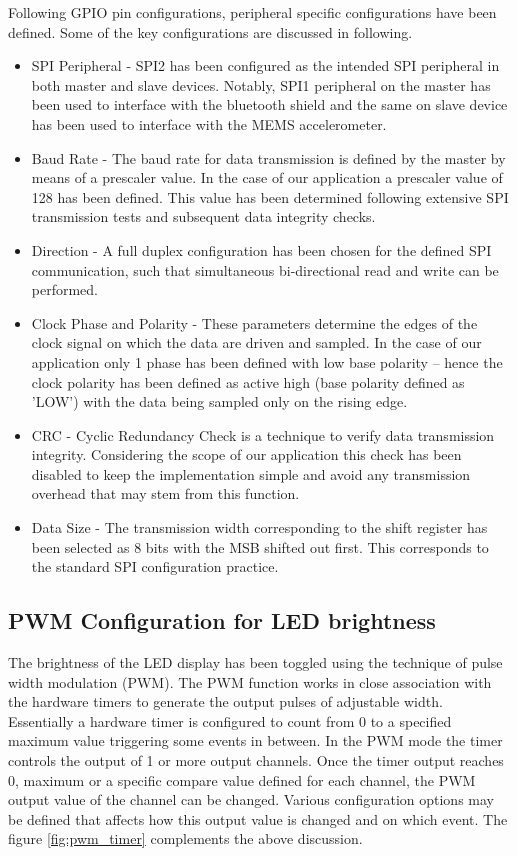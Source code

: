 Following GPIO pin configurations, peripheral specific configurations have been defined. Some of the key configurations are discussed in following.
\begin{itemize}
\item SPI Peripheral - SPI2 has been configured as the intended SPI peripheral in both master and slave devices. Notably, SPI1 peripheral on the master has been used to interface with the bluetooth shield and the same on slave device has been used to interface with the MEMS accelerometer.
\item Baud Rate - The baud rate for data transmission is defined by the master by means of a prescaler value. In the case of our application a prescaler value of 128 has been defined. This value has been determined following extensive SPI transmission tests and subsequent data integrity checks.
\item Direction - A full duplex configuration has been chosen for the defined SPI communication, such that simultaneous bi-directional read and write can be performed.
\item Clock Phase and Polarity - These parameters determine the edges of the clock signal on which the data are driven and sampled. In the case of our application only 1 phase has been defined with low base polarity -- hence the clock polarity has been defined as active high (base polarity defined as 'LOW') with the data being sampled only on the rising edge.
\item CRC - Cyclic Redundancy Check is a technique to verify data transmission integrity. Considering the scope of our application this check has been disabled to keep the implementation simple and avoid any transmission overhead that may stem from this function. 
\item Data Size - The transmission width corresponding to the shift register has been selected as 8 bits with the MSB shifted out first. This corresponds to the standard SPI configuration practice. 
\end{itemize}

\subsection{PWM Configuration for LED brightness}
The brightness of the LED display has been toggled using the technique of pulse width modulation (PWM). The PWM function works in close association with the hardware timers to generate the output pulses of adjustable width. Essentially a hardware timer is configured to count from 0 to a specified maximum value triggering some events in between. In the PWM mode the timer controls the output of 1 or more output channels. Once the timer output reaches 0, maximum or a specific compare value defined for each channel, the PWM output value of the channel can be changed. Various configuration options may be defined that affects how this output value is changed and on which event. The figure \ref{fig:pwm_timer} complements the above discussion.

